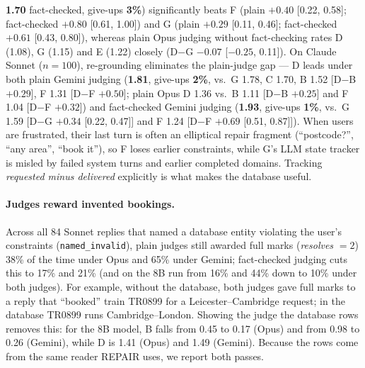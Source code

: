 \documentclass[11pt]{article}
\begin{document}
\textbf{1.70} fact-checked, give-ups \textbf{3\%}) significantly beats F (plain $+0.40$ [0.22, 0.58];
fact-checked $+0.80$ [0.61, 1.00]) and G (plain $+0.29$ [0.11, 0.46]; fact-checked $+0.61$ [0.43, 0.80]),
whereas plain Opus judging without fact-checking rates D (1.08), G (1.15) and E (1.22) closely (D$-$G $-0.07$
[$-0.25$, 0.11]). On Claude Sonnet ($n=100$), re-grounding eliminates the plain-judge gap --- D leads under
both plain Gemini judging (\textbf{1.81}, give-ups \textbf{2\%}, vs.\ G 1.78, C 1.70, B 1.52 [D$-$B $+0.29$],
F 1.31 [D$-$F $+0.50$]; plain Opus D 1.36 vs.\ B 1.11 [D$-$B $+0.25$] and F 1.04 [D$-$F $+0.32$]) and
fact-checked Gemini judging (\textbf{1.93}, give-ups \textbf{1\%}, vs.\ G 1.59 [D$-$G $+0.34$ [0.22, 0.47]]
and F 1.24 [D$-$F $+0.69$ [0.51, 0.87]]). When users are frustrated, their last turn is
often an elliptical repair fragment (``postcode?'', ``any area'', ``book it''), so F loses earlier constraints,
while G's LLM state tracker is misled by failed system turns and earlier completed domains. Tracking
\emph{requested minus delivered} explicitly is what makes the database useful.

\paragraph{Judges reward invented bookings.} Across all 84 Sonnet replies that named a database entity
violating the user's constraints (\texttt{named\_invalid}), plain judges still awarded full marks
(\emph{resolves} $= 2$) 38\% of the time under Opus and 65\% under Gemini; fact-checked judging cuts this to
17\% and 21\% (and on the 8B run from 16\% and 44\% down to 10\% under both judges). For example, without the
database, both judges gave full marks to a reply that ``booked'' train TR0899 for a Leicester--Cambridge
request; in the database TR0899 runs Cambridge--London. Showing the judge the database rows removes this: for
the 8B model, B falls from 0.45 to 0.17 (Opus) and from 0.98 to 0.26 (Gemini), while D is 1.41 (Opus) and
1.49 (Gemini). Because the rows come from the same reader REPAIR uses, we report both passes.
\end{document}
